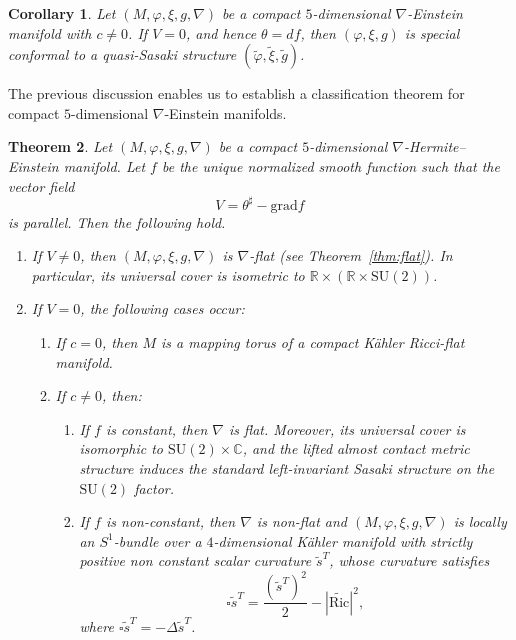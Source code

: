 \documentclass{article}
\newtheorem{thm}{Theorem}[section]
\newtheorem{cor}[thm]{Corollary}
\theoremstyle{definition}
\newcommand{\R}{\mathbb{R}}
\newcommand{\C}{\mathbb{C}}
\renewcommand{\phi}{\varphi}
\numberwithin{equation}{section}
\begin{document}
\begin{cor} \label{corolnablaHermEins}
 Let $(M,\phi,\xi,g, \nabla)$ be a compact $5$-dimensional $\nabla$-Einstein manifold with $c \neq 0$. If $V = 0$, and hence $\theta = df$, then $(\phi,\xi,g)$ is special conformal to a quasi-Sasaki structure $(\tilde \phi,\tilde \xi,\tilde g)$.
\end{cor}
\medskip

The previous discussion enables us to establish a classification theorem for compact $5$-dimensional $\nabla$-Einstein manifolds.
\begin{thm} \label{thm:5}
Let $(M,\phi,\xi,g,\nabla)$ be a compact $5$-dimensional $\nabla$-Hermite--Einstein manifold. Let $f$ be the unique normalized smooth function such that the vector field
\[
V = \theta^\sharp - \mathrm{grad} f
\]
is parallel. Then the following hold.

\begin{enumerate}
\item If $V \neq 0$, then $(M,\phi,\xi,g,\nabla)$ is $\nabla$-flat (see Theorem~\ref{thm:flat}). In particular, its universal cover is isometric to $\R \times (\R \times \mathrm{SU}(2))$. 

\item If $V = 0$, the following cases occur:
\begin{enumerate}
    \item If $c = 0$, then $M$ is a mapping torus of a compact K\"ahler Ricci-flat manifold.
    
    \item If $c \neq 0$, then:
    \begin{enumerate}
        \item If $f$ is constant, then $\nabla$ is flat. Moreover, its universal cover is isomorphic to $\mathrm{SU}(2) \times \C$, and the lifted almost contact metric structure induces the standard left-invariant Sasaki structure on the $\mathrm{SU}(2)$ factor.
        
        \item If $f$ is non-constant, then $\nabla$ is non-flat and $(M,\phi,\xi,g,\nabla)$ is locally an $S^1$-bundle over a $4$-dimensional K\"ahler manifold with strictly positive non constant scalar curvature $\tilde s^T$, whose curvature satisfies
        \[
        \square \tilde s^T = \frac{(\tilde {s}^T)^{2}}{2} - |\tilde{\mathrm{Ric}}|^2,
        \]
        where $\square \tilde s^T = -\Delta \tilde s^T$.
    \end{enumerate}
\end{enumerate}
\end{enumerate}
\end{thm}
\end{document}
